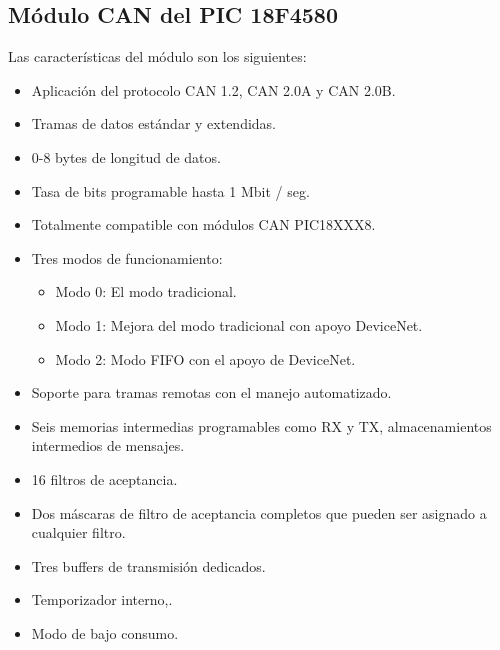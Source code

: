 \subsection{Módulo CAN del PIC 18F4580}
Las características del módulo son los siguientes:
\begin{itemize}
\item Aplicación del protocolo CAN 1.2,
CAN 2.0A y CAN 2.0B.
\item Tramas de datos estándar y extendidas.
\item 0-8 bytes de longitud de datos.
\item Tasa de bits programable hasta 1 Mbit / seg.
\item Totalmente compatible con módulos CAN PIC18XXX8.
\item Tres modos de funcionamiento:
	\begin{itemize}
    	\item Modo 0: El modo tradicional.
		\item Modo 1: Mejora del modo tradicional con
apoyo DeviceNet.
		\item Modo 2: Modo FIFO con el apoyo de DeviceNet.
	\end {itemize}
\item Soporte para tramas remotas con el manejo automatizado.
\item  Seis memorias intermedias programables como RX y TX, 
almacenamientos intermedios de mensajes.
\item 16 filtros de aceptancia.
\item Dos máscaras de filtro de aceptancia completos que pueden ser asignado a cualquier filtro.
\item Tres buffers de transmisión dedicados.
\item Temporizador interno,\cite{DaP}.
\item Modo de bajo consumo.
\end{itemize}

